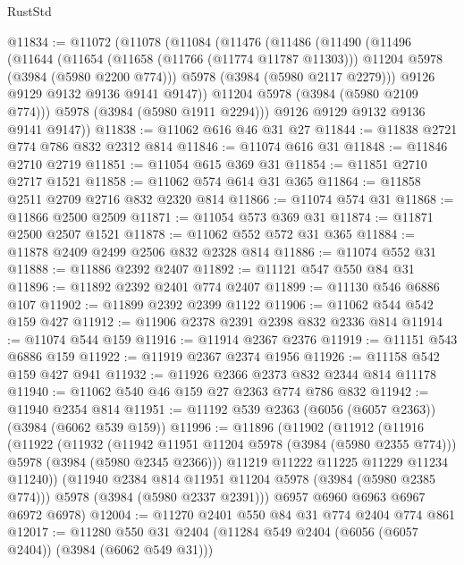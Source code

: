 \begin{lexlean}{RustStd}
\begin{coremodule}
@11834 := @11072
    (@11078
      (@11084
        (@11476
          (@11486
            (@11490
              (@11496
                (@11644
                  (@11654
                    (@11658 (@11766 (@11774 @11787 @11303)))
                    @11204
                    @5978
                    (@3984 (@5980 @2200 @774)))
                  @5978
                  (@3984 (@5980 @2117 @2279)))
                @9126
                @9129
                @9132
                @9136
                @9141
                @9147))
            @11204
            @5978
            (@3984 (@5980 @2109 @774)))
          @5978
          (@3984 (@5980 @1911 @2294)))
        @9126
        @9129
        @9132
        @9136
        @9141
        @9147))
@11838 := @11062 @616 @46 @31 @27
@11844 := @11838 @2721 @774 @786 @832 @2312 @814
@11846 := @11074 @616 @31
@11848 := @11846 @2710 @2719
@11851 := @11054 @615 @369 @31
@11854 := @11851 @2710 @2717 @1521
@11858 := @11062 @574 @614 @31 @365
@11864 := @11858 @2511 @2709 @2716 @832 @2320 @814
@11866 := @11074 @574 @31
@11868 := @11866 @2500 @2509
@11871 := @11054 @573 @369 @31
@11874 := @11871 @2500 @2507 @1521
@11878 := @11062 @552 @572 @31 @365
@11884 := @11878 @2409 @2499 @2506 @832 @2328 @814
@11886 := @11074 @552 @31
@11888 := @11886 @2392 @2407
@11892 := @11121 @547 @550 @84 @31
@11896 := @11892 @2392 @2401 @774 @2407
@11899 := @11130 @546 @6886 @107
@11902 := @11899 @2392 @2399 @1122
@11906 := @11062 @544 @542 @159 @427
@11912 := @11906 @2378 @2391 @2398 @832 @2336 @814
@11914 := @11074 @544 @159
@11916 := @11914 @2367 @2376
@11919 := @11151 @543 @6886 @159
@11922 := @11919 @2367 @2374 @1956
@11926 := @11158 @542 @159 @427 @941
@11932 := @11926 @2366 @2373 @832 @2344 @814 @11178
@11940 := @11062 @540 @46 @159 @27 @2363 @774 @786 @832
@11942 := @11940 @2354 @814
@11951 := @11192 @539 @2363 (@6056 (@6057 @2363)) (@3984 (@6062 @539 @159))
@11996 := @11896
    (@11902
      (@11912
        (@11916
          (@11922
            (@11932
              (@11942 @11951 @11204 @5978 (@3984 (@5980 @2355 @774)))
              @5978
              (@3984 (@5980 @2345 @2366)))
            @11219
            @11222
            @11225
            @11229
            @11234
            @11240))
        (@11940 @2384 @814 @11951 @11204 @5978 (@3984 (@5980 @2385 @774)))
        @5978
        (@3984 (@5980 @2337 @2391)))
      @6957
      @6960
      @6963
      @6967
      @6972
      @6978)
@12004 := @11270 @2401 @550 @84 @31 @774 @2404 @774 @861
@12017 := @11280 @550 @31 @2404 (@11284 @549 @2404 (@6056 (@6057 @2404)) (@3984 (@6062 @549 @31)))

\end{coremodule}
\end{lexlean}

